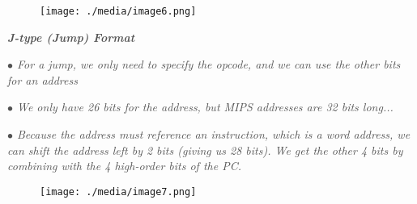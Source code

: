 \documentclass[12pt]{article}
\begin{document}

\begin{figure}[H]
	\begin{Center}
		\texttt{[image: ./media/image6.png]}
	\end{Center}
\end{figure}



\par

{\fontsize{14pt}{16.8pt}\selectfont \textbf{\textit{\textcolor[HTML]{525252}{J-type (Jump) Format }}}\par}\par

\begin{adjustwidth}{0.5in}{0.0in}
\textit{\textcolor[HTML]{525252}{$\bullet$  For a jump, we only need to specify the opcode, and we can use the other bits for an address}}\par

\end{adjustwidth}

\textit{\textcolor[HTML]{525252}{$\bullet$  We only have 26 bits for the address, but MIPS addresses are 32 bits long...}}\par

\begin{adjustwidth}{0.5in}{0.0in}
\textit{\textcolor[HTML]{525252}{$\bullet$  Because the address must reference an instruction, which is a word address, we can shift the address left by 2 bits (giving us 28 bits). We get the other 4 bits by combining with the 4 high-order bits of the PC.}}\par

\end{adjustwidth}




\begin{figure}[H]
	\begin{Center}
		\texttt{[image: ./media/image7.png]}
	\end{Center}
\end{figure}



\ \ \ \ \ \ \ \ \ \ \ \ \ \ \ \ \ \ \ \ \ \ \ \ \ \ \ \ \ \ \ \ \ \ \  \par
\end{document}
